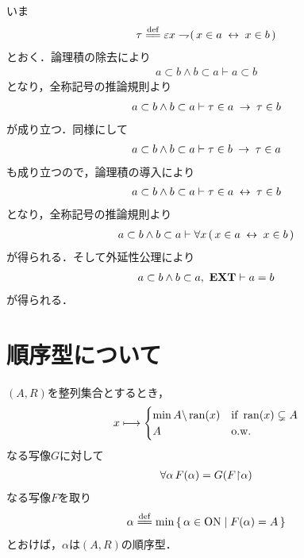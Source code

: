 	\begin{sketch}
		いま
		\begin{align}
			\tau \defeq \varepsilon x \negation (\, x \in a \lrarrow x \in b\, )
		\end{align}
		とおく．論理積の除去により
		\begin{align}
			a \subset b \wedge b \subset a \vdash a \subset b
		\end{align}
		となり，全称記号の推論規則より
		\begin{align}
			a \subset b \wedge b \subset a \vdash \tau \in a \hspace{0.25em}\rightarrow\hspace{0.25em} \tau \in b
		\end{align}
		が成り立つ．同様にして
		\begin{align}
			a \subset b \wedge b \subset a \vdash \tau \in b \hspace{0.25em}\rightarrow\hspace{0.25em} \tau \in a
		\end{align}
		も成り立つので，論理積の導入により
		\begin{align}
			a \subset b \wedge b \subset a \vdash \tau \in a \hspace{0.25em}\leftrightarrow\hspace{0.25em} \tau \in b
		\end{align}
		となり，全称記号の推論規則より
		\begin{align}
			a \subset b \wedge b \subset a \vdash 
			\forall x\, (\, x \in a \hspace{0.25em}\leftrightarrow\hspace{0.25em} x \in b\, )
		\end{align}
		が得られる．そして外延性公理により
		\begin{align}
			a \subset b \wedge b \subset a,\ \mbox{{\bf EXT}} \vdash a = b 
		\end{align}
		が得られる．
		\QED
	\end{sketch}
	
\section{順序型について}
	$(A,R)$を整列集合とするとき，
	\begin{align}
		x \longmapsto 
		\begin{cases}
			\min{A \backslash \operatorname*{ran} (x)} & \mbox{if } \operatorname*{ran} (x) \subsetneq A \\
			A & \mbox{o.w.} \\
		\end{cases}
	\end{align}
	なる写像$G$に対して
	\begin{align}
		\forall \alpha\, F(\alpha) = G(F\hspace{-0.25em}\upharpoonright\hspace{-0.25em}{\alpha})
	\end{align}
	なる写像$F$を取り
	\begin{align}
		\alpha \defeq \min{\Set{\alpha \in \ON}{F(\alpha) = A}}
	\end{align}
	とおけば，$\alpha$は$(A,R)$の順序型．
	
